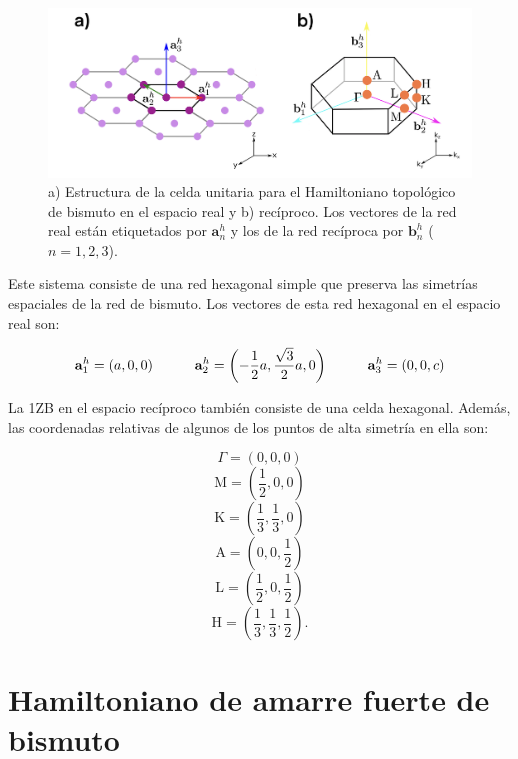 \documentclass[
  letterpaper,
  DIV=11,
  numbers=noendperiod]{scrreprt}
\begin{document}
\begin{figure}

{\centering \includegraphics{./images/HexRealRec.png}

}

\caption{a) Estructura de la celda unitaria para el Hamiltoniano
topológico de bismuto en el espacio real y b) recíproco. Los vectores de
la red real están etiquetados por \(\mathbf{a}^h_n\) y los de la red
recíproca por \(\mathbf{b}^h_n\) (\(n=1,2,3\)).}

\end{figure}

Este sistema consiste de una red hexagonal simple que preserva las
simetrías espaciales de la red de bismuto. Los vectores de esta red
hexagonal en el espacio real son:

\[
\begin{align} 
    \mathbf{a}_1^h = \left (a,0,0 \right ) \hspace{10mm}
    \mathbf{a}_2^h = \left ( -\frac{1}{2}a , \frac{\sqrt{3}}{2}a , 0 \right ) \hspace{10mm}
    \mathbf{a}_3^h = \left (             0 , 0,c \right ) 
\end{align}
\]

La 1ZB en el espacio recíproco también consiste de una celda hexagonal.
Además, las coordenadas relativas de algunos de los puntos de alta
simetría en ella son:

\[    
\Gamma = \left ( 0,0,0 \right )
\] \[
    \mathrm{M} = \left ( \frac{1}{2},0,0 \right ) 
\] \[
    \mathrm{K} = \left ( \frac{1}{3},\frac{1}{3},0 \right ) 
\] \[
    \mathrm{A} = \left ( 0,0, \frac{1}{2} \right )
\] \[
    \mathrm{L} = \left ( \frac{1}{2},0,\frac{1}{2} \right ) 
\] \[
    \mathrm{H} = \left ( \frac{1}{3},\frac{1}{3},\frac{1}{2} \right ).
\]


\hypertarget{sec-hamiltonian}{%
\chapter{Hamiltoniano de amarre fuerte de
bismuto}\label{sec-hamiltonian}}
\end{document}
